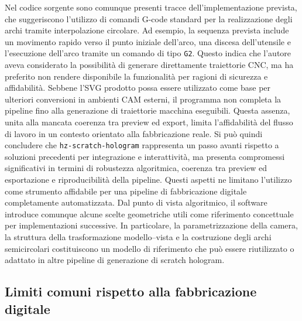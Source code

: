 \documentclass[a4paper,11pt,titlepage,twoside]{book}
\newcommand{\1}{\mathbf{1}}
\numberwithin{equation}{chapter}
\theoremstyle{plain}
\theoremstyle{definition}
\begin{document}
	Nel codice sorgente sono comunque presenti tracce dell’implementazione prevista, che suggeriscono l’utilizzo di comandi G-code standard per la realizzazione degli archi tramite interpolazione circolare. Ad esempio, la sequenza prevista include un movimento rapido verso il punto iniziale dell’arco, una discesa dell’utensile e l’esecuzione dell’arco tramite un comando di tipo \texttt{G2}. Questo indica che l’autore aveva considerato la possibilità di generare direttamente traiettorie CNC, ma ha preferito non rendere disponibile la funzionalità per ragioni di sicurezza e affidabilità.
	Sebbene l’SVG prodotto possa essere utilizzato come base per ulteriori conversioni in ambienti CAM esterni, il programma non completa la pipeline fino alla generazione di traiettorie macchina eseguibili. Questa assenza, unita alla mancata coerenza tra preview ed export, limita l’affidabilità del flusso di lavoro in un contesto orientato alla fabbricazione reale.
	Si può quindi concludere che \texttt{hz-scratch-hologram} rappresenta un passo avanti rispetto a soluzioni precedenti per integrazione e interattività, ma presenta compromessi significativi in termini di robustezza algoritmica, coerenza tra preview ed esportazione e riproducibilità della pipeline. Questi aspetti ne limitano l’utilizzo come strumento affidabile per una pipeline di fabbricazione digitale completamente automatizzata.
	Dal punto di vista algoritmico, il software introduce comunque alcune scelte geometriche utili come riferimento concettuale per implementazioni successive. In particolare, la parametrizzazione della camera, la struttura della trasformazione modello--vista e la costruzione degli archi semicircolari costituiscono un modello di riferimento che può essere riutilizzato o adattato in altre pipeline di generazione di scratch hologram.
	
	\subsection{Limiti comuni rispetto alla fabbricazione digitale}
	
\end{document}
